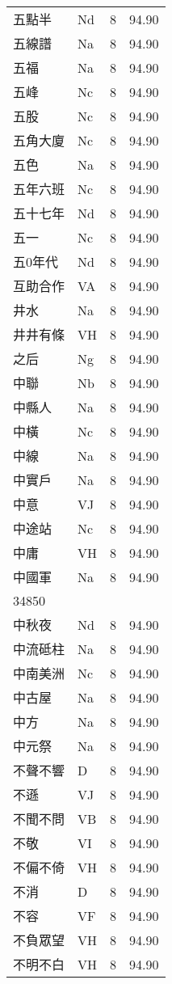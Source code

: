 \documentclass[twocolumn]{book}
\begin{document}
\begin{supertabular}{llrr}
五點半 & Nd & 8 &  94.90\\
五線譜 & Na & 8 &  94.90\\
五福 & Na & 8 &  94.90\\
五峰 & Nc & 8 &  94.90\\
五股 & Nc & 8 &  94.90\\
五角大廈 & Nc & 8 &  94.90\\
五色 & Na & 8 &  94.90\\
五年六班 & Nc & 8 &  94.90\\
五十七年 & Nd & 8 &  94.90\\
五一 & Nc & 8 &  94.90\\
五0年代 & Nd & 8 &  94.90\\
互助合作 & VA & 8 &  94.90\\
井水 & Na & 8 &  94.90\\
井井有條 & VH & 8 &  94.90\\
之后 & Ng & 8 &  94.90\\
中聯 & Nb & 8 &  94.90\\
中縣人 & Na & 8 &  94.90\\
中橫 & Nc & 8 &  94.90\\
中線 & Na & 8 &  94.90\\
中實戶 & Na & 8 &  94.90\\
中意 & VJ & 8 &  94.90\\
中途站 & Nc & 8 &  94.90\\
中庸 & VH & 8 &  94.90\\
中國軍 & Na & 8 &  94.90\\
34850\\
中秋夜 & Nd & 8 &  94.90\\
中流砥柱 & Na & 8 &  94.90\\
中南美洲 & Nc & 8 &  94.90\\
中古屋 & Na & 8 &  94.90\\
中方 & Na & 8 &  94.90\\
中元祭 & Na & 8 &  94.90\\
不聲不響 & D & 8 &  94.90\\
不遜 & VJ & 8 &  94.90\\
不聞不問 & VB & 8 &  94.90\\
不敬 & VI & 8 &  94.90\\
不偏不倚 & VH & 8 &  94.90\\
不消 & D & 8 &  94.90\\
不容 & VF & 8 &  94.90\\
不負眾望 & VH & 8 &  94.90\\
不明不白 & VH & 8 &  94.90\\

\end{supertabular}
\end{document}
